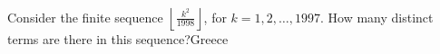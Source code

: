 Consider the finite sequence $\left\lfloor \frac{k^2}{1998} \right\rfloor$,  for $k=1,2,\ldots, 1997$. How many distinct terms are there in this sequence?Greece